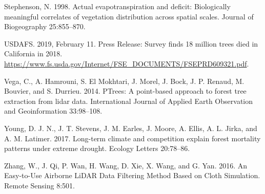 \documentclass[]{article}
\begin{document}
\hypertarget{ref-stephenson1998}{}
Stephenson, N. 1998. Actual evapotranspiration and deficit: Biologically
meaningful correlates of vegetation distribution across spatial scales.
Journal of Biogeography 25:855--870.

\hypertarget{ref-usdafs2019}{}
USDAFS. 2019, February 11. Press Release: Survey finds 18 million trees
died in California in 2018.
\url{https://www.fs.usda.gov/Internet/FSE_DOCUMENTS/FSEPRD609321.pdf}.

\hypertarget{ref-vega2014}{}
Vega, C., A. Hamrouni, S. El Mokhtari, J. Morel, J. Bock, J. P. Renaud,
M. Bouvier, and S. Durrieu. 2014. PTrees: A point-based approach to
forest tree extraction from lidar data. International Journal of Applied
Earth Observation and Geoinformation 33:98--108.

\hypertarget{ref-young2017}{}
Young, D. J. N., J. T. Stevens, J. M. Earles, J. Moore, A. Ellis, A. L.
Jirka, and A. M. Latimer. 2017. Long-term climate and competition
explain forest mortality patterns under extreme drought. Ecology Letters
20:78--86.

\hypertarget{ref-zhang2016}{}
Zhang, W., J. Qi, P. Wan, H. Wang, D. Xie, X. Wang, and G. Yan. 2016. An
Easy-to-Use Airborne LiDAR Data Filtering Method Based on Cloth
Simulation. Remote Sensing 8:501.
\end{document}
